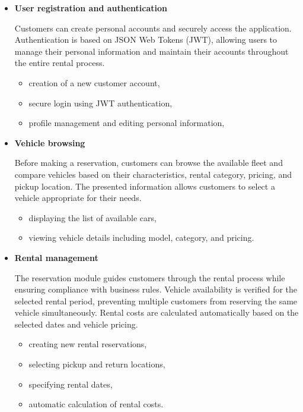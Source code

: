 \begin{itemize}

    \item \textbf{User registration and authentication}

    Customers can create personal accounts and securely access the application. Authentication is based on JSON Web Tokens (JWT), allowing users to manage their personal information and maintain their accounts throughout the entire rental process.

    \begin{itemize}
        \item creation of a new customer account,
        \item secure login using JWT authentication,
        \item profile management and editing personal information,
    \end{itemize}

    \item \textbf{Vehicle browsing}

    Before making a reservation, customers can browse the available fleet and compare vehicles based on their characteristics, rental category, pricing, and pickup location. The presented information allows customers to select a vehicle appropriate for their needs.

    \begin{itemize}
        \item displaying the list of available cars,
        \item viewing vehicle details including model, category, and pricing.
    \end{itemize}

    \item \textbf{Rental management}

    The reservation module guides customers through the rental process while ensuring compliance with business rules. Vehicle availability is verified for the selected rental period, preventing multiple customers from reserving the same vehicle simultaneously. Rental costs are calculated automatically based on the selected dates and vehicle pricing.

    \begin{itemize}
        \item creating new rental reservations,
        \item selecting pickup and return locations,
        \item specifying rental dates,
        \item automatic calculation of rental costs.
    \end{itemize}


\end{itemize}
